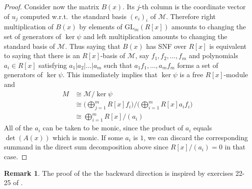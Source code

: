 \documentclass[11pt]{article}
\theoremstyle{definition}
\newtheorem{remark}[theo]{Remark}
\numberwithin{equation}{section}
\newcommand{\GL}{\mathrm{GL}}
\begin{document}
\begin{proof}
Consider now the matrix $ B(x) $. Its  $ j$-th column is the coordinate vector of $ u_{j} $ computed w.r.t.\  the standard basis $ ( e_{i} )_{i} $ of  $ \mathcal {  M  } $. Therefore right multiplication of $ B(x) $ by elements of $ \GL_{m}(R[x]) $ amounts to changing the set of generators of $ \ker \psi      $    and left multiplication amounts to changing the  standard  basis of $   \mathcal{M} $. Thus saying that $ B(x) $ has SNF over $ R[x] $ is equivalent to saying that there is an $R[x]$-basis of $    \mathcal  {  M   } $, say $ f_{1}, f_{2}, \ldots, f_{m} $   and polynomials $ a_{i} \in R[x]  $ satisfying $ a_{1} | a_{2 }  | \ldots | a_{m}  $ such that $  a_{1} f_{1}, \ldots , a_{m}  f_{m} $ forms a set of generators   of $ \ker \psi $.  This immediately implies that $ \ker \psi $ is a free $R[x] $-module and        
\begin{align*}   M    &  \cong     \mathcal{M }      /  \ker \psi    \\     & \cong  \bigg ( \bigoplus_{j=1}^{m} R[x] f_{i}    \bigg ) \bigg /   \bigg ( \bigoplus_{i=1}^{m} R[x] a_{i} f_{i}  \bigg  )   \\ 
& \cong \bigoplus_{i=1}^{m}  R[x]/ (a_{i})                                                                           
 \end{align*} 
All of the $ a_{i} $ can be taken to be monic, since the product of $ a_{i} $ equals $ \det(A(x)) $ which is monic.  If some $ a_{i} $ is $ 1 $, we can discard  the corresponding summand in the direct sum  decomposition above since  $  R[x] /  (a_{i}) = 0    $ in that case.                                                                                    \end{proof}


\begin{remark} The proof of the the backward direction  is  inspired by exercises 22-25 of \cite[\S 2]{D&F}.   
\end{remark}       
 
\end{document}
